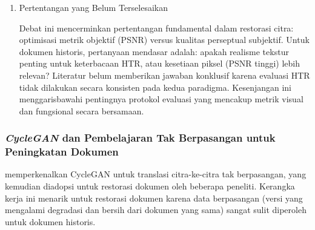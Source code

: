 \documentclass[12pt,a4paper]{article}
\begin{document}
\begin{enumerate}[leftmargin=*, labelindent=0pt, itemsep=1ex, topsep=0pt]
Perbandingan kualitatif dalam literatur menunjukkan kompromi: DocEnTr menghasilkan citra dengan PSNR tinggi namun cenderung \textit{over-smoothed} (hilangnya tekstur kertas), sementara DE-GAN dengan PSNR lebih rendah mempertahankan tekstur natural namun dapat menghasilkan artefak adversarial. Text-DIAE mencoba posisi tengah dengan \textit{degradation-invariant learning}, namun tanpa komponen adversarial juga menghasilkan tekstur kurang realistis dibanding GAN.

\item Pertentangan yang Belum Terselesaikan

Debat ini mencerminkan pertentangan fundamental dalam restorasi citra: optimisasi metrik objektif (PSNR) versus kualitas perseptual subjektif. Untuk dokumen historis, pertanyaan mendasar adalah: apakah realisme tekstur penting untuk keterbacaan HTR, atau kesetiaan piksel (PSNR tinggi) lebih relevan? Literatur belum memberikan jawaban konklusif karena evaluasi HTR tidak dilakukan secara konsisten pada kedua paradigma. Kesenjangan ini menggarisbawahi pentingnya protokol evaluasi yang mencakup metrik visual dan fungsional secara bersamaan.

\end{enumerate}

\subsubsection{\textit{CycleGAN} dan Pembelajaran Tak Berpasangan untuk Peningkatan Dokumen}
\label{subsubsec:cyclegan-unpaired}

\textcite{zhu2017} memperkenalkan CycleGAN untuk translasi citra-ke-citra tak berpasangan, yang kemudian diadopsi untuk restorasi dokumen oleh beberapa peneliti. Kerangka kerja ini menarik untuk restorasi dokumen karena data berpasangan (versi yang mengalami degradasi dan bersih dari dokumen yang sama) sangat sulit diperoleh untuk dokumen historis.
\end{document}

